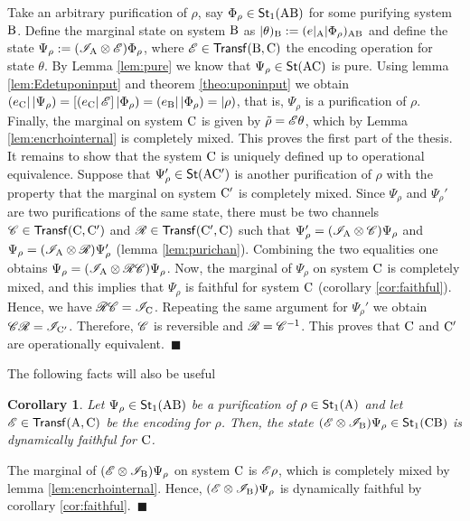 \documentclass[12pt,aps,pra,showpacs,groupedaddress]{revtex4-1}
\newtheorem{corollary}{Corollary} \newtheorem{theorem}{Theorem}
\def\Proof{\medskip\par\noindent{\bf Proof. }}
\def\qed{$\,\blacksquare$\par}
\def\rB{{\rm B}}
\def\rC{{\rm C}}
\def\Stset{{\mathsf{St}}}
\def\Trnset{{\mathsf{Transf}}}
\def\K#1{\left|#1\right)}  \def\B#1{\left(#1\right|}
\begin{document}
\Proof Take an arbitrary purification of $\rho$, say $\Phi_\rho\in\Stset_1(\rA\rB)$ for some
purifying system $\rB$.  Define the marginal state on system $\rB$ as $|\theta)_\rB
:=(e|_{\rA}|\Phi_\rho)_{\rA\rB}$ and define the state $\Psi_\rho:= (\mathscr I_{\rm A}\otimes\mathscr E) \Phi_\rho$,
where $\tE\in\Trnset (\rB, \rC)$ the encoding operation for state $\theta$.  By Lemma \ref{lem:pure}
we know that $\Psi_\rho\in\Stset(\rA\rC)$ is pure.  Using lemma \ref{lem:Edetuponinput} and theorem
\ref{theo:uponinput} we obtain $\B{e_\rC} \K{\Psi_\rho} = [ \B{ e_\rC} \tE ] \K{ \Phi_{\rho}} = \B
{e_\rB} \K{ \Phi_\rho} = \K \rho$, that is, $\Psi_\rho$ is a purification of $\rho$.  Finally, the
marginal on system $\rC$ is given by $\tilde \rho = \mathscr E \theta$, which by Lemma
\ref{lem:encrhointernal} is completely mixed.  This proves the first part of the thesis. It remains
to show that the system $\rC$ is uniquely defined up to operational equivalence.  Suppose that
$\Psi_\rho' \in\Stset(\rA \rC')$ is another purification of $\rho$ with the property that the
marginal on system $\rC'$ is completely mixed.  Since $\Psi_\rho$ and $\Psi_\rho'$ are two
purifications of the same state, there must be two channels $\tC\in \Trnset(\rC, \rC')$ and $\tR
\in\Trnset( \rC', \rC)$ such that $\Psi'_{\rho} = (\mathscr I_{\rm A} \otimes \mathscr C) \Psi_\rho$ and $\Psi_\rho =
(\mathscr I_{\rm A} \otimes \mathscr R) \Psi_\rho'$ (lemma \ref{lem:purichan}).  Combining the two equalities one
obtains $\Psi_{\rho} = (\mathscr I_{\rm A} \otimes \mathscr R \mathscr C) \Psi_\rho$. Now, the marginal of $\Psi_\rho$ on
system $\rC$ is completely mixed, and this implies that $\Psi_\rho$ is faithful for system $\rC$
(corollary \ref{cor:faithful}).  Hence, we have $\tR \tC = \tI_{ \rC}$.  Repeating the same argument
for $\Psi_\rho'$ we obtain $\tC \tR = \tI_{\rC'}$.  Therefore, $\mathscr C$ is reversible and $\mathscr R =
\mathscr C^{-1}$.  This proves that $\rC$ and $\rC'$ are operationally equivalent.  \qed



The following facts will also be useful

\begin{corollary}
  Let $\Psi_\rho\in\Stset_1(\rA\rB)$ be a purification of $\rho \in\Stset_1 (\rA)$ and let $\tE\in
  \Trnset(\rA, \rC)$ be the encoding for $\rho$.  Then, the state $(\tE\otimes\tI_\rB) \Psi_\rho
  \in\Stset_1(\rC\rB)$ is dynamically faithful for $\rC$.
 \label{cor:faithcomp}
\end{corollary}
\Proof The marginal of $(\tE \otimes \tI_\rB) \Psi_\rho$ on system $\rC$ is $\mathscr E \rho$, which is completely mixed by
lemma \ref{lem:encrhointernal}. Hence, $(\tE \otimes \tI_\rB) \Psi_\rho$ is dynamically faithful by
corollary \ref{cor:faithful}. \qed
\end{document}
